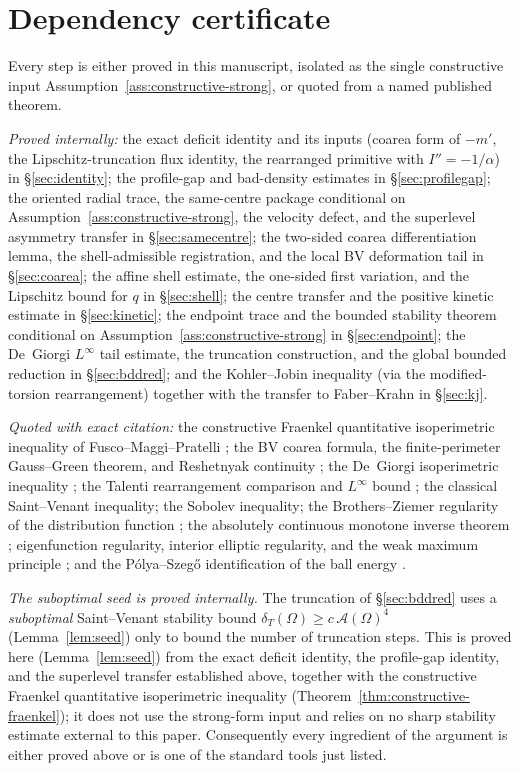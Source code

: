 \documentclass[11pt]{amsart}
\theoremstyle{definition}
\newcommand{\Om}{\Omega}
\newcommand{\Fr}{\mathcal A}
\newcommand{\dT}{\delta_T}
\begin{document}
\section{Dependency certificate}\label{app:constants}

Every step is either proved in this manuscript, isolated as the single
constructive input Assumption~\ref{ass:constructive-strong}, or quoted from a
named published theorem.

\emph{Proved internally:} the exact deficit identity and its inputs (coarea
form of \(-m'\), the Lipschitz-truncation flux identity, the rearranged
primitive with \(I''=-1/\alpha\)) in \S\ref{sec:identity}; the profile-gap and
bad-density estimates in \S\ref{sec:profilegap}; the
oriented radial trace, the same-centre package conditional on
Assumption~\ref{ass:constructive-strong}, the velocity defect, and the
superlevel asymmetry transfer in \S\ref{sec:samecentre}; the two-sided coarea
differentiation lemma, the shell-admissible registration, and the local BV
deformation tail in \S\ref{sec:coarea}; the affine shell estimate, the
one-sided first variation, and the Lipschitz bound for \(q\) in
\S\ref{sec:shell}; the centre transfer and the positive kinetic estimate in
\S\ref{sec:kinetic}; the endpoint trace and the bounded stability theorem conditional on
Assumption~\ref{ass:constructive-strong} in
\S\ref{sec:endpoint}; the De~Giorgi \(L^\infty\) tail estimate, the truncation
construction, and the global bounded reduction in \S\ref{sec:bddred}; and the
Kohler--Jobin inequality (via the modified-torsion rearrangement) together with
the transfer to Faber--Krahn in \S\ref{sec:kj}.

\emph{Quoted with exact citation:} the constructive Fraenkel quantitative
isoperimetric inequality of Fusco--Maggi--Pratelli \cite{FMP}; the BV coarea
formula, the finite-perimeter Gauss--Green theorem, and Reshetnyak continuity
\cite{AFP2000,Maggi2012}; the De~Giorgi isoperimetric inequality
\cite{DeGiorgi1958}; the Talenti rearrangement comparison and \(L^\infty\) bound
\cite{Talenti1976}; the classical Saint--Venant inequality; the
Sobolev inequality; the Brothers--Ziemer regularity of the distribution
function \cite{AFP2000}; the absolutely continuous monotone inverse theorem
\cite{BBC1975}; eigenfunction regularity, interior elliptic regularity, and the
weak maximum principle \cite{GilbargTrudinger2001}; and the P\'olya--Szeg\H{o}
identification of the ball energy \cite{PolyaSzego1951,Bandle1980}.

\emph{The suboptimal seed is proved internally.} The truncation of
\S\ref{sec:bddred} uses a \emph{suboptimal} Saint--Venant stability bound
\(\dT(\Om)\ge c\,\Fr(\Om)^4\) (Lemma~\ref{lem:seed}) only to bound the number
of truncation steps.  This is proved here (Lemma~\ref{lem:seed}) from the
exact deficit identity, the profile-gap identity, and the superlevel transfer
established above, together with the constructive Fraenkel quantitative
isoperimetric inequality (Theorem~\ref{thm:constructive-fraenkel}); it does
not use the strong-form input and relies on no sharp stability estimate external
to this paper.  Consequently
every ingredient of the argument is either proved above or is one of the
standard tools just listed.
\end{document}
